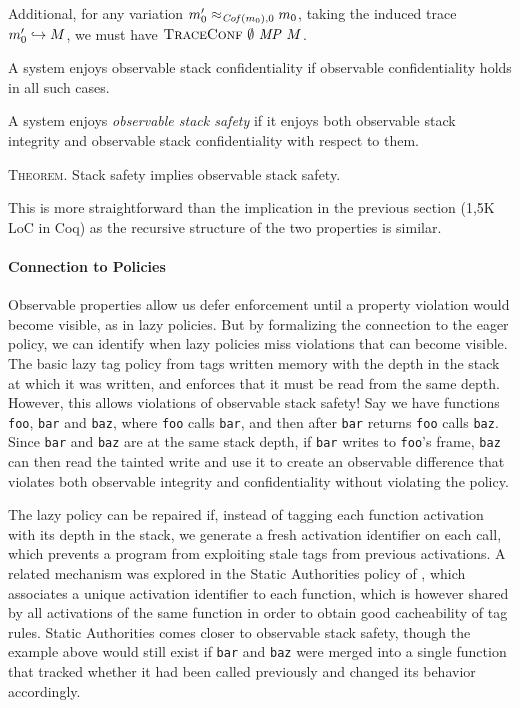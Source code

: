 \documentclass[acmsmall,review,anonymous]{acmart}\settopmatter{printfolios=true,printccs=false,printacmref=false}
\begin{document}
{{      Additional, for any variation \(m_0' \approx_{\mathit{Cof}(m_0),0}
      m_0\), taking the induced trace  \(m_0' \hookrightarrow
      M\), we must have \(\text{\sc TraceConf} ~ \emptyset ~ \mathit{MP} ~ M\).

      A system enjoys observable stack confidentiality if observable
      confidentiality holds in all such cases.

    A system enjoys {\em observable stack safety}
    if it enjoys both observable stack integrity and
      observable stack confidentiality with respect to them.

      \medskip
      \textsc{Theorem.}
      Stack safety implies observable stack safety.
      \smallskip

      This is more straightforward than the implication in the previous
      section (1,5K LoC in Coq) as the recursive
      structure of the two properties is similar.

    \paragraph{Connection to Policies}

    Observable properties allow us defer enforcement until a property
    violation would become visible, as in lazy policies. But by formalizing
    the connection to the eager policy, we can identify when lazy policies
    miss violations that can become visible. The basic lazy tag policy from
    \citet{DBLP:conf/sp/RoesslerD18} tags written memory with the depth in the
    stack at which it was written, and enforces that it must be read from the
    same depth. However, this allows violations of observable stack safety!
    Say we have functions {\tt foo}, {\tt bar} and {\tt baz}, where {\tt foo}
    calls {\tt bar}, and then after {\tt bar} returns {\tt foo} calls
    {\tt baz}. Since {\tt bar} and {\tt baz} are at the same stack depth, if
    {\tt bar} writes to {\tt foo}'s frame, {\tt baz} can then read the tainted
    write and use it to create an observable difference that violates both
    observable integrity and confidentiality without violating the policy.

    The lazy policy can be repaired if, instead of tagging each function
    activation with its depth in the stack, we generate a fresh activation
    identifier on each call, which prevents a program from exploiting stale
    tags from previous activations. A related mechanism was explored in the
    Static Authorities policy of \citet{DBLP:conf/sp/RoesslerD18}, which
    associates a unique activation identifier to each function, which is
    however shared by all activations of the same function in order to obtain
    good cacheability of tag rules. Static Authorities comes closer to
    observable stack safety, though the example above would still exist
    if {\tt bar} and {\tt baz} were merged into a single function that tracked
    whether it had been called previously and changed its behavior accordingly.


}}
\end{document}
